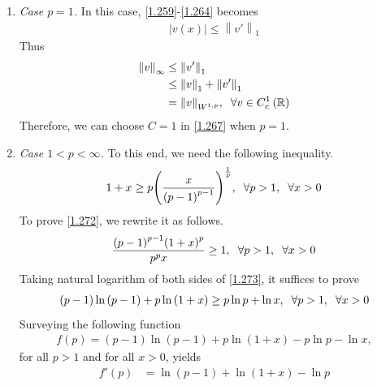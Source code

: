 \documentclass[a4paper,oneside]{book}
\numberwithin{equation}{chapter}
\begin{document}
\begin{enumerate}
\item \textit{Case $p=1$.} In this case, \eqref{1.259}-\eqref{1.264} becomes
\begin{align}
\left| {v\left( x \right)} \right| \le {\left\| {v'} \right\|_1}
\end{align}
Thus
\begin{align}
{\left\| v \right\|_\infty } &\le {\left\| {v'} \right\|_1}\\
& \le {\left\| v \right\|_1} + {\left\| {v'} \right\|_1}\\
& = {\left\| v \right\|_{{W^{1,p}}}},\hspace{0.2cm}\forall v \in C_c^1\left( \mathbb{R} \right)
\end{align}
Therefore, we can choose $C=1$ in \eqref{1.267} when $p=1$.
\item \textit{Case $1<p<\infty$.} To this end, we need the following inequality.
\begin{align}
\label{1.272}
1 + x \ge p{\left( {\frac{x}{{{{\left( {p - 1} \right)}^{p - 1}}}}} \right)^{\frac{1}{p}}},\hspace{0.2cm}\forall p > 1,\hspace{0.2cm}\forall x > 0
\end{align}
To prove \eqref{1.272}, we rewrite it as follows.
\begin{align}
\label{1.273}
\frac{{{{\left( {p - 1} \right)}^{p - 1}}{{\left( {1 + x} \right)}^p}}}{{{p^p}x}} \ge 1,\hspace{0.2cm}\forall p > 1,\hspace{0.2cm}\forall x > 0
\end{align}
Taking natural logarithm of both sides of \eqref{1.273}, it suffices to prove
\begin{align}
\left( {p - 1} \right)\ln \left( {p - 1} \right) + p\ln \left( {1 + x} \right) \ge p\ln p + \ln x,\hspace{0.2cm}\forall p > 1,\hspace{0.2cm}\forall x > 0
\end{align}
Surveying the following function
\begin{align}
f\left( p \right) = \left( {p - 1} \right)\ln \left( {p - 1} \right) + p\ln \left( {1 + x} \right) - p\ln p - \ln x ,
\end{align}
for all $p>1$ and for all $x>0$, yields
\begin{align}
f'\left( p \right) &= \ln \left( {p - 1} \right) + \ln \left( {1 + x} \right) - \ln p\\

\end{align}
\end{enumerate}
\end{document}
